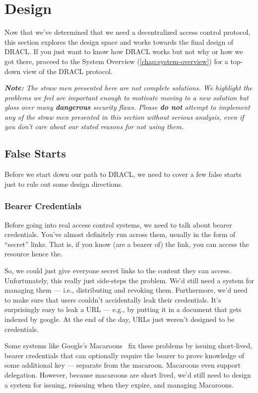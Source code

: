 \documentclass[pdftex,12pt,a4papaer,twoside,notitlepage]{report}
\newcommand{\note}[1]{\vspace{1em} \begin{spacing}{1}\textit{\textbf{Note:} #1}\end{spacing}\vspace{1em}}
\begin{document}
\section{Design}
\label{sec:design}

Now that we've determined that we need a decentralized access control protocol,
this section explores the design space and works towards the final design of
DRACL. If you just want to know how DRACL works but not why or how we got there,
proceed to the System Overview (\cref{chap:system-overview}) for a
top-down view of the DRACL protocol.

\note{The straw men presented here are not complete solutions. We highlight the
  problems we feel are important enough to motivate moving to a new solution but
  gloss over many \textbf{dangerous} security flaws. Please \textbf{do not}
  attempt to implement any of the straw men presented in this section without
  serious analysis, even if you don't care about our stated reasons for not using
  them.}

\subsection{False Starts}

Before we start down our path to DRACL, we need to cover a few false starts just
to rule out some design directions.

\subsubsection{Bearer Credentials}

Before going into real access control systems, we need to talk about bearer
credentials. You've almost definitely run across them, usually in the form of
``secret'' links. That is, if you know (are a bearer of) the link, you can
access the resource hence the.

So, we could just give everyone secret links to the content they can access.
Unfortunately, this really just side-steps the problem. We'd still need a system
for managing them --- i.e., distributing and revoking them. Furthermore, we'd
need to make sure that users couldn't accidentally leak their credentials. It's
surprisingly easy to leak a URL --- e.g., by putting it in a document that gets
indexed by google. At the end of the day, URLs just weren't designed to be
credentials.

Some systems like Google's Macaroons~\cite{macaroon} fix these problems by
issuing short-lived, bearer credentials that can optionally require the bearer
to prove knowledge of some additional key --- separate from the macaroon.
Macaroons even support delegation. However, because macaroons are short lived,
we'd still need to design a system for issuing, reissuing when they expire,
and managing Macaroons.
\end{document}
